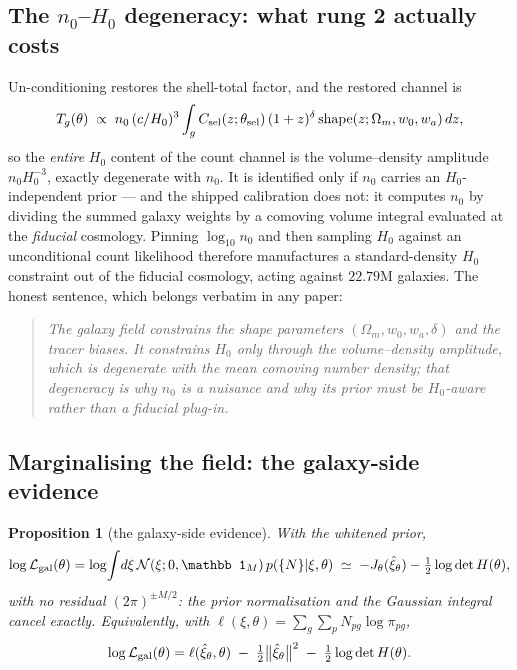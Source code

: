 \documentclass[11pt]{article}
\newtheorem{proposition}{Proposition}
\theoremstyle{definition}
\theoremstyle{remark}
\begin{document}
\subsection{The \texorpdfstring{$n_0$--$H_0$}{n0-H0} degeneracy: what rung 2 actually costs}
\label{sec:n0h0}

Un-conditioning restores the shell-total factor, and the restored channel is
\begin{equation}
  T_g(\theta)\;\propto\;n_0\,(c/H_0)^3\int_g C_{\rm sel}(z;\theta_{\rm sel})\,(1+z)^{\delta}\,
  \text{shape}(z;\Omega_m,w_0,w_a)\,dz ,
  \label{eq:Tg}
\end{equation}
so the \emph{entire} $H_0$ content of the count channel is the volume--density
amplitude $n_0H_0^{-3}$, exactly degenerate with $n_0$. It is identified only if
$n_0$ carries an $H_0$-independent prior --- and the shipped calibration does not:
it computes $n_0$ by dividing the summed galaxy weights by a comoving volume
integral evaluated at the \emph{fiducial} cosmology. Pinning $\log_{10}n_0$ and then
sampling $H_0$ against an unconditional count likelihood therefore manufactures a
standard-density $H_0$ constraint out of the fiducial cosmology, acting against
$22.79$M galaxies. The honest sentence, which belongs verbatim in any paper:

\begin{quote}\itshape
The galaxy field constrains the shape parameters $(\Omega_m,w_0,w_a,\delta)$ and
the tracer biases. It
constrains $H_0$ only through the volume--density amplitude, which is degenerate
with the mean comoving number density; that degeneracy is why $n_0$ is a nuisance
and why its prior must be $H_0$-aware rather than a fiducial plug-in.
\end{quote}

\subsection{Marginalising the field: the galaxy-side evidence}
\label{sec:laplace}

\begin{proposition}[the galaxy-side evidence]
\label{prop:laplace}
With the whitened prior,
\begin{equation}
  \log\mathcal L_{\rm gal}(\theta)
  =\log\!\int\!d\xi\,\mathcal N(\xi;0,\mathbb 1_M)\,p(\{N\}|\xi,\theta)
  \;\simeq\;-J_\theta(\hat\xi_\theta)-\tfrac12\log\det H(\theta),
  \label{eq:laplace}
\end{equation}
with \emph{no} residual $(2\pi)^{\pm M/2}$: the prior normalisation and the Gaussian
integral cancel exactly. Equivalently, with
$\ell(\xi,\theta)=\sum_g\sum_pN_{pg}\log\pi_{pg}$,
\begin{equation}
  \log\mathcal L_{\rm gal}(\theta)
  =\ell(\hat\xi_\theta,\theta)\;-\;\tfrac12\big\|\hat\xi_\theta\big\|^2
  \;-\;\tfrac12\log\det H(\theta).
  \label{eq:evidence}
\end{equation}
\end{proposition}
\end{document}

